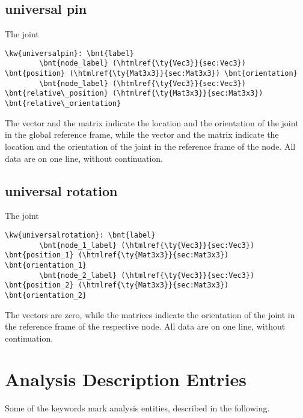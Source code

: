 \subsection{universal pin}
The  joint
\begin{Verbatim}[commandchars=\\\{\}]
    \kw{universalpin}: \bnt{label}
        \bnt{node_label} (\htmlref{\ty{Vec3}}{sec:Vec3}) \bnt{position} (\htmlref{\ty{Mat3x3}}{sec:Mat3x3}) \bnt{orientation}
        \bnt{node_label} (\htmlref{\ty{Vec3}}{sec:Vec3}) \bnt{relative\_position} (\htmlref{\ty{Mat3x3}}{sec:Mat3x3}) \bnt{relative\_orientation}
\end{Verbatim}
The  vector and the  matrix indicate 
the location and the orientation of the joint in the global reference frame, 
while the  vector
and the  matrix indicate
the location and the orientation of the joint
in the reference frame of the node.
All data are on one line, without continuation.

\subsection{universal rotation}
The  joint
\begin{Verbatim}[commandchars=\\\{\}]
    \kw{universalrotation}: \bnt{label}
        \bnt{node_1_label} (\htmlref{\ty{Vec3}}{sec:Vec3}) \bnt{position_1} (\htmlref{\ty{Mat3x3}}{sec:Mat3x3}) \bnt{orientation_1}
        \bnt{node_2_label} (\htmlref{\ty{Vec3}}{sec:Vec3}) \bnt{position_2} (\htmlref{\ty{Mat3x3}}{sec:Mat3x3}) \bnt{orientation_2}
\end{Verbatim}
The  vectors are zero,
while the  matrices indicate the orientation of the joint
in the reference frame of the respective node.
All data are on one line, without continuation.


\section{Analysis Description Entries}
Some of the keywords mark analysis entities, described in the following.

